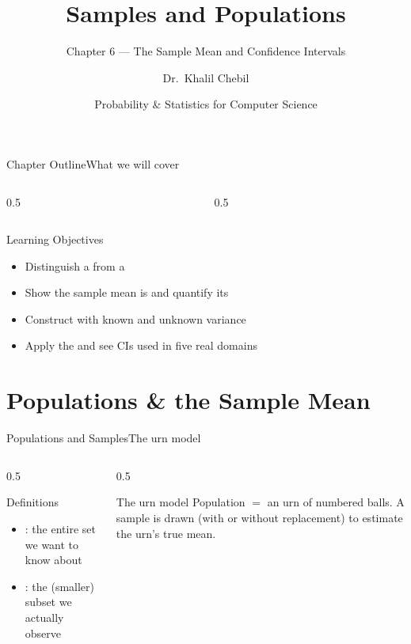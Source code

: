 \documentclass[aspectratio=169,11pt]{beamer}
\title[Ch.\,6 — Samples \& Populations]{Samples and Populations}
\subtitle{Chapter 6 — The Sample Mean and Confidence Intervals}
\author{Dr.\ Khalil Chebil}
\date{Probability \& Statistics for Computer Science}
\begin{document}
{
\begin{frame}
  \titlepage
\end{frame}}

\begin{frame}{Chapter Outline}{What we will cover}
  \begin{columns}[T]
    \begin{column}{0.5\textwidth}
      \tableofcontents[sections={1-3}]
    \end{column}
    \begin{column}{0.5\textwidth}
      \tableofcontents[sections={4-7}]
    \end{column}
  \end{columns}
  \vfill
  \begin{block}{Learning Objectives}
    \begin{itemize}
      \item Distinguish a  from a 
      \item Show the sample mean is  and quantify its 
      \item Construct  with known and unknown variance
      \item Apply the  and see CIs used in five real domains
    \end{itemize}
  \end{block}
\end{frame}

\section{Populations \& the Sample Mean}

\begin{frame}{Populations and Samples}{The urn model}
  \begin{columns}[T]
    \begin{column}{0.5\textwidth}
      \begin{block}{Definitions}
        \small
        \begin{itemize}
          \item {}: the entire set we want to know about
          \item {}: the (smaller) subset we actually observe
        \end{itemize}
      \end{block}
    \end{column}
    \begin{column}{0.5\textwidth}
      \begin{exampleblock}{The urn model}
        \small Population $=$ an urn of numbered balls. A sample is drawn
        (with or without replacement) to estimate the urn's true mean.
      \end{exampleblock}
    \end{column}
  \end{columns}
\end{frame}
\end{document}
